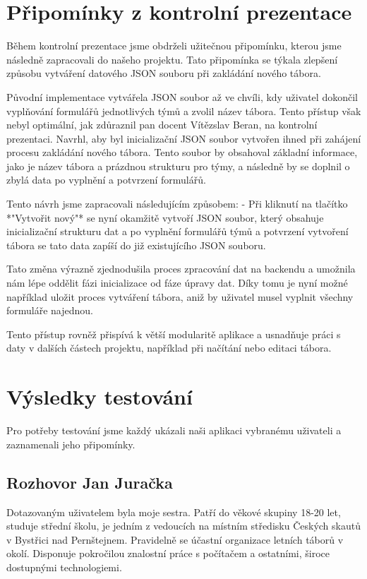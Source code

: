 \documentclass[a4paper, 12pt]{article} %
\begin{document}
\section{Připomínky z kontrolní prezentace}

Během kontrolní prezentace jsme obdrželi užitečnou připomínku, kterou jsme následně 
zapracovali do našeho projektu. Tato připomínka se týkala zlepšení způsobu vytváření datového 
JSON souboru při zakládání nového tábora. 

Původní implementace vytvářela JSON soubor až ve chvíli, kdy uživatel dokončil vyplňování 
formulářů jednotlivých týmů a zvolil název tábora. Tento přístup však nebyl optimální, jak 
zdůraznil pan docent Vítězslav Beran, na kontrolní prezentaci. Navrhl, aby byl 
inicializační JSON soubor vytvořen ihned při zahájení procesu zakládání nového tábora. 
Tento soubor by obsahoval základní informace, jako je název tábora a prázdnou strukturu 
pro týmy, a následně by se doplnil o zbylá data po vyplnění a potvrzení formulářů.

Tento návrh jsme zapracovali následujícím způsobem:
- Při kliknutí na tlačítko *"Vytvořit nový"* se nyní okamžitě vytvoří
JSON soubor, který obsahuje inicializační strukturu dat a po vyplnění formulářů týmů a 
potvrzení vytvoření tábora se tato data zapíší do již existujícího JSON souboru.

Tato změna výrazně zjednodušila proces zpracování dat na backendu a umožnila nám lépe oddělit fázi inicializace od fáze úpravy dat. Díky tomu je nyní možné například uložit proces vytváření tábora, aniž by uživatel musel vyplnit všechny formuláře najednou.

Tento přístup rovněž přispívá k větší modularitě aplikace a usnadňuje práci s daty v dalších částech projektu, například při načítání nebo editaci tábora.


\section{Výsledky testování}
Pro potřeby testování jsme každý ukázali naši aplikaci vybranému uživateli a zaznamenali jeho připomínky.

\subsection{Rozhovor Jan Juračka}
\par Dotazovaným uživatelem byla moje sestra.
Patří do věkové skupiny 18-20 let, studuje střední školu, je jedním z vedoucích na místním středisku Českých skautů v Bystřici nad Pernštejnem. Pravidelně se účastní organizace letních táborů v okolí. Disponuje pokročilou znalostní práce s počítačem a ostatními, široce dostupnými technologiemi.
\end{document}

